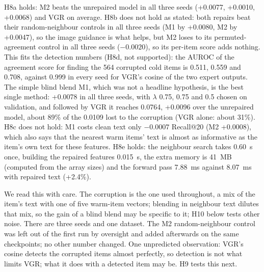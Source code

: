 \documentclass[conference]{IEEEtran}
\begin{document}
H8a holds: M2 beats the unrepaired model in all three seeds (+0.0077, +0.0010, +0.0068) and VGR on average. H8b does not hold as stated: both repairs beat their random-neighbour controls in all three seeds (M1 by +0.0080, M2 by +0.0047), so the image guidance is what helps, but M2 loses to its permuted-agreement control in all three seeds ($-0.0020$), so its per-item score adds nothing. This fits the detection numbers (H8d, not supported): the AUROC of the agreement score for finding the 564 corrupted cold items is 0.511, 0.559 and 0.708, against 0.999 in every seed for VGR's cosine of the two expert outputs. The simple blind blend M1, which was not a headline hypothesis, is the best single method: +0.0078 in all three seeds, with $\lambda$ 0.75, 0.75 and 0.5 chosen on validation, and followed by VGR it reaches 0.0764, +0.0096 over the unrepaired model, about 89\% of the 0.0109 lost to the corruption (VGR alone: about 31\%). H8c does not hold: M1 costs clean text only $-0.0007$ Recall@20 (M2 +0.0008), which also says that the nearest warm items' text is almost as informative as the item's own text for these features. H8e holds: the neighbour search takes 0.60~s once, building the repaired features 0.015~s, the extra memory is 41~MB (computed from the array sizes) and the forward pass 7.88~ms against 8.07~ms with repaired text (+2.4\%).

We read this with care. The corruption is the one used throughout, a mix of the item's text with one of five warm-item vectors; blending in neighbour text dilutes that mix, so the gain of a blind blend may be specific to it; H10 below tests other noise. There are three seeds and one dataset. The M2 random-neighbour control was left out of the first run by oversight and added afterwards on the same checkpoints; no other number changed. One unpredicted observation: VGR's cosine detects the corrupted items almost perfectly, so detection is not what limits VGR; what it does with a detected item may be. H9 tests this next.
\end{document}
